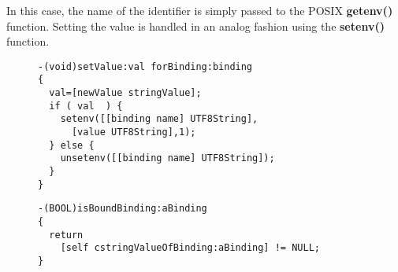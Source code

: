 \documentclass[preprint,authoryear]{acm_proc_article-sp}
\begin{document}
In this case, the name of the identifier is simply passed to the POSIX {\bf getenv()} function.
Setting the value is handled in an analog fashion using the {\bf setenv()} function.


\begin{figure}[htbp]
\begin{lstlisting}[style=L,label=setvalue-env,caption=Set value in env: scheme.]
-(void)setValue:val forBinding:binding
{
  val=[newValue stringValue];
  if ( val  ) {
    setenv([[binding name] UTF8String],
      [value UTF8String],1);
  } else {
    unsetenv([[binding name] UTF8String]);
  }
}
\end{lstlisting}
\end{figure}


\begin{figure}[htbp]
\begin{lstlisting}[style=L,label=hasValue-env,caption=Checking for presence of value in env: scheme.]
-(BOOL)isBoundBinding:aBinding
{
  return 
    [self cstringValueOfBinding:aBinding] != NULL;
}
\end{lstlisting}
\end{figure}
\end{document}
